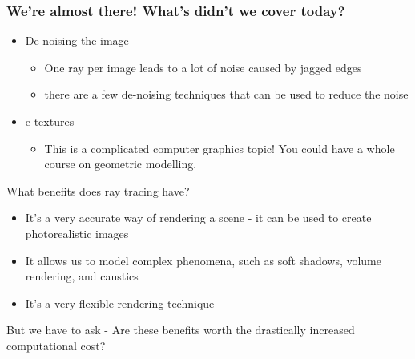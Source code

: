\documentclass[12pt]{beamer}
\begin{document}
  \begin{frame}
    \frametitle{We're almost there! What's didn't we cover today?}

    \begin{itemize}

      \item De-noising the image

      \begin{itemize}
        \item One ray per image leads to a lot of noise caused by jagged edges
        \item there are a few de-noising techniques that can be used to reduce the noise
      \end{itemize}

      \item e textures

      \begin{itemize}
        \item This is a complicated computer graphics topic!
        You could have a whole course on geometric modelling.
      \end{itemize}

    \end{itemize}

  \end{frame}

  \begin{frame}{What benefits does ray tracing have?}

    \begin{itemize}
      \item It's a very accurate way of rendering a scene - it can be used to create photorealistic images
      \item It allows us to model complex phenomena, such as soft shadows, volume rendering, and caustics
      \item It's a very flexible rendering technique %
      \end{itemize}

      But we have to ask - Are these benefits worth the drastically increased computational cost?
  \end{frame}
\end{document}
